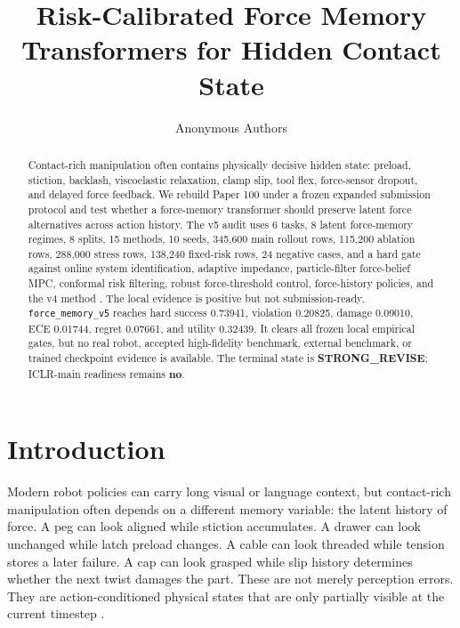 \documentclass{article}
\title{Risk-Calibrated Force Memory Transformers for Hidden Contact State}
\author{Anonymous Authors}
\newcommand{\method}[1]{\texttt{#1}}
\begin{document}
\maketitle

\begin{abstract}
Contact-rich manipulation often contains physically decisive hidden state: preload, stiction, backlash, viscoelastic relaxation, clamp slip, tool flex, force-sensor dropout, and delayed force feedback. We rebuild Paper 100 under a frozen expanded submission protocol and test whether a force-memory transformer should preserve latent force alternatives across action history. The v5 audit uses 6 tasks, 8 latent force-memory regimes, 8 splits, 15 methods, 10 seeds, 345,600 main rollout rows, 115,200 ablation rows, 288,000 stress rows, 138,240 fixed-risk rows, 24 negative cases, and a hard gate against online system identification, adaptive impedance, particle-filter force-belief MPC, conformal risk filtering, robust force-threshold control, force-history policies, and the v4 method \citep{wang2022sgeitl1,shen2024vmetransformer2,fang2019scene3,li2025gppt4}. The local evidence is positive but not submission-ready. \method{force\_memory\_v5} reaches hard success 0.73941, violation 0.20825, damage 0.09010, ECE 0.01744, regret 0.07661, and utility 0.32439. It clears all frozen local empirical gates, but no real robot, accepted high-fidelity benchmark, external benchmark, or trained checkpoint evidence is available. The terminal state is \textbf{STRONG\_REVISE}; ICLR-main readiness remains \textbf{no}.
\end{abstract}

\section{Introduction}
Modern robot policies can carry long visual or language context, but contact-rich manipulation often depends on a different memory variable: the latent history of force. A peg can look aligned while stiction accumulates. A drawer can look unchanged while latch preload changes. A cable can look threaded while tension stores a later failure. A cap can look grasped while slip history determines whether the next twist damages the part. These are not merely perception errors. They are action-conditioned physical states that are only partially visible at the current timestep \citep{li2023transformer5,yang2022scene6,fan2024embodied7,wang2023hscnet8,dominguezvidal2024exploring9,hoffmann2017cloudedge10}.
\end{document}
